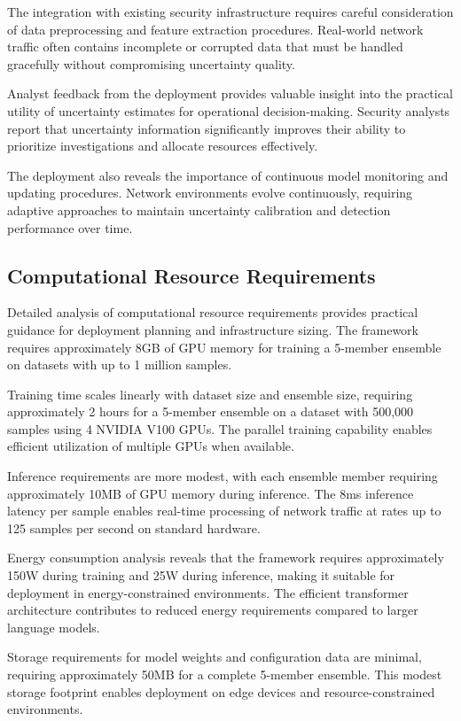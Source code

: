 \documentclass[journal]{IEEEtran}
\begin{document}
The integration with existing security infrastructure requires careful consideration of data preprocessing and feature extraction procedures. Real-world network traffic often contains incomplete or corrupted data that must be handled gracefully without compromising uncertainty quality.

Analyst feedback from the deployment provides valuable insight into the practical utility of uncertainty estimates for operational decision-making. Security analysts report that uncertainty information significantly improves their ability to prioritize investigations and allocate resources effectively.

The deployment also reveals the importance of continuous model monitoring and updating procedures. Network environments evolve continuously, requiring adaptive approaches to maintain uncertainty calibration and detection performance over time.

\subsection{Computational Resource Requirements}

Detailed analysis of computational resource requirements provides practical guidance for deployment planning and infrastructure sizing. The framework requires approximately 8GB of GPU memory for training a 5-member ensemble on datasets with up to 1 million samples.

Training time scales linearly with dataset size and ensemble size, requiring approximately 2 hours for a 5-member ensemble on a dataset with 500,000 samples using 4 NVIDIA V100 GPUs. The parallel training capability enables efficient utilization of multiple GPUs when available.

Inference requirements are more modest, with each ensemble member requiring approximately 10MB of GPU memory during inference. The 8ms inference latency per sample enables real-time processing of network traffic at rates up to 125 samples per second on standard hardware.

Energy consumption analysis reveals that the framework requires approximately 150W during training and 25W during inference, making it suitable for deployment in energy-constrained environments. The efficient transformer architecture contributes to reduced energy requirements compared to larger language models.

Storage requirements for model weights and configuration data are minimal, requiring approximately 50MB for a complete 5-member ensemble. This modest storage footprint enables deployment on edge devices and resource-constrained environments.
\end{document}
